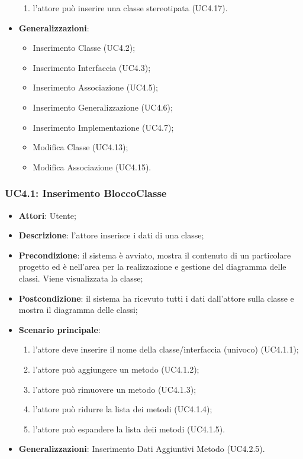 \begin{itemize}
\begin{enumerate}
		\item l'attore può inserire una classe stereotipata (UC4.17).
	\end{enumerate}
	\item \textbf{Generalizzazioni}:
	\begin{itemize}
		\item Inserimento Classe (UC4.2);
		\item Inserimento Interfaccia (UC4.3);
		\item Inserimento Associazione (UC4.5);
		\item Inserimento Generalizzazione (UC4.6);
		\item Inserimento Implementazione (UC4.7);
		\item Modifica Classe (UC4.13);
		\item Modifica Associazione (UC4.15).
	\end{itemize}
\end{itemize}

\subsubsection{UC4.1: Inserimento BloccoClasse}
\label{UC4.1}
\begin{itemize}
	\item \textbf{Attori}: Utente;
	\item \textbf{Descrizione}: l'attore inserisce i dati di una classe;
	\item \textbf{Precondizione}: il sistema è avviato, mostra il contenuto di un particolare progetto ed è nell'area per la realizzazione e gestione del diagramma delle classi. Viene visualizzata la classe;
	\item \textbf{Postcondizione}: il sistema ha ricevuto tutti i dati dall'attore sulla classe e mostra il diagramma delle classi;
	\item \textbf{Scenario principale}:
	\begin{enumerate}
		\item l'attore deve inserire il nome della classe/interfaccia (univoco) (UC4.1.1);
		\item l'attore può aggiungere un metodo (UC4.1.2);
		\item l'attore può rimuovere un metodo (UC4.1.3);
		\item l'attore può ridurre la lista dei metodi (UC4.1.4);
		\item l'attore può espandere la lista deii metodi (UC4.1.5).
	\end{enumerate}
	\item \textbf{Generalizzazioni}: Inserimento Dati Aggiuntivi Metodo (UC4.2.5).%
\end{itemize}

